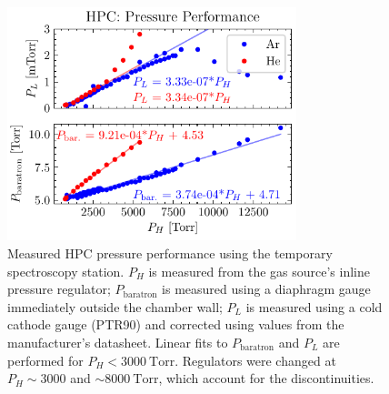 \begin{figure}
	\centering
	\includegraphics[width=0.75\textwidth]{figures/chap3/HPC_press_performance.pdf}
	\caption{Measured HPC pressure performance using the temporary spectroscopy station. $P_H$ is measured from the gas source's inline pressure regulator; $P_{\textrm{baratron}}$ is measured using a diaphragm gauge immediately outside the chamber wall; $P_L$ is measured using a cold cathode gauge (PTR90) and corrected using values from the manufacturer's datasheet. Linear fits to $P_{\textrm{baratron}}$ and $P_L$ are performed for  $P_H < 3000 \ \textrm{Torr}$. Regulators were changed at $P_H \sim 3000$ and $\sim 8000 \ \textrm{Torr}$, which account for the discontinuities.}
	\label{fig:HPC_press_performance}
\end{figure}

